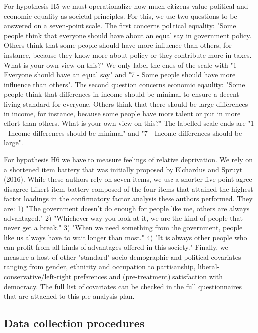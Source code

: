 \documentclass[12pt, letterpaper]{article}
\begin{document}
\begin{spacing}{1.5}
For hypothesis H5 we must operationalize how much citizens value political and economic equality as societal principles. For this, we use two questions to be answered on a seven-point scale. The first concerns political equality: "Some people think that everyone should have about an equal say in government policy. Others think that some people should have more influence than others, for instance, because they know more about policy or they contribute more in taxes. What is your own view on this?" We only label the ends of the scale with "1 - Everyone should have an equal say" and "7 - Some people should have more influence than others". The second question concerns economic eqaulity: "Some people think that differences in income should be minimal to ensure a decent living standard for everyone. Others think that there should be large differences in income, for instance, because some people have more talent or put in more effort than others. What is your own view on this?" The labelled scale ends are "1 - Income differences should be minimal" and "7 - Income differences should be large".

For hypothesis H6 we have to measure feelings of relative deprivation. We rely on a shortened item battery that was initially proposed by Elchardus and Spruyt (2016). While these authors rely on seven items, we use a shorter five-point agree-disagree Likert-item battery composed of the four items that attained the highest factor loadings in the confirmatory factor analysis these authors performed. They are: 1) "The government doesn't do enough for people like me, others are always advantaged." 2) "Whichever way you look at it, we are the kind of people that never get a break." 3) "When we need something from the government, people like us always have to wait longer than most." 4) "It is always other people who can profit from all kinds of advantages offered in this society."
Finally, we measure a host of other "standard" socio-demographic and political covariates ranging from gender, ethnicity and occupation to partisanship, liberal- conservative/left-right preferences and (pre-treatment) satisfaction with democracy. The full list of covariates can be checked in the full questionnaires that are attached to this pre-analysis plan.



\subsection*{Data collection procedures}



\end{spacing}
\end{document}
